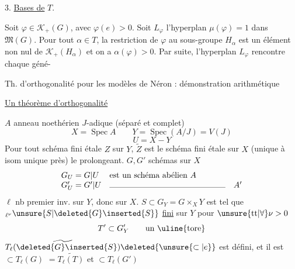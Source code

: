 3. \uline{Bases de} $T$.

Soit $\varphi\in\mathcal K_+(G)$, avec $\varphi(e)>0$. Soit $L_\varphi$ l'hyperplan $\mu(\varphi)=1$ dans $\mathfrak M(G)$. Pour tout $\alpha\in T$, la restriction de $\varphi$ au sous-groupe $H_\alpha$ est un élément non nul de $\mathcal K_+(H_\alpha)$ et on a $\alpha(\varphi)>0$. Par suite, l'hyperplan $L_\varphi$ rencontre chaque géné-

Th. d'orthogonalité  pour les modèles de Néron : démonstration arithmétique

\uline{Un théorème d'orthogonalité}

$A$ anneau noethérien $J$-adique (séparé et complet)
\[
X=\operatorname{Spec}A\qquad
Y=\operatorname{Spec}(A/J)=V(J)
\]
\[
U=X-Y
\]
Pour tout schéma fini étale $Z$ sur $Y$, $\widetilde Z$ est le schéma fini étale sur $X$ (unique à isom unique près) le prolongeant.
$G,G'$ schémas    sur $X$ 
\[
\begin{array}{ll}
G_U=G|U&\text{est un schéma abélien }A\\
G'_U=G'|U&\text{\rule{5cm}{.3pt}}\quad A'
\end{array}
\]
$\ell$  nb premier inv. sur $Y$, donc sur $X$.
$S\subset G_Y=G\times_XY$ est  tel que ${}_{\ell^\nu}\unsure{S|\deleted{G}\inserted{S}}$ \uline{fini} sur $Y$ pour $\unsure{\mathrm{tt}|\forall}\nu>0$
\[
T'\subset G'_Y\qquad\text{un \uline{tore}}
\]
$\widetilde{T_\ell(\deleted{G}\inserted{S})}\deleted{\unsure{\subset|e}}$ est défini, et il est $\subset T_\ell(G)$
 $=\widetilde{T_\ell(T)}$  et $\subset T_\ell(G')$

